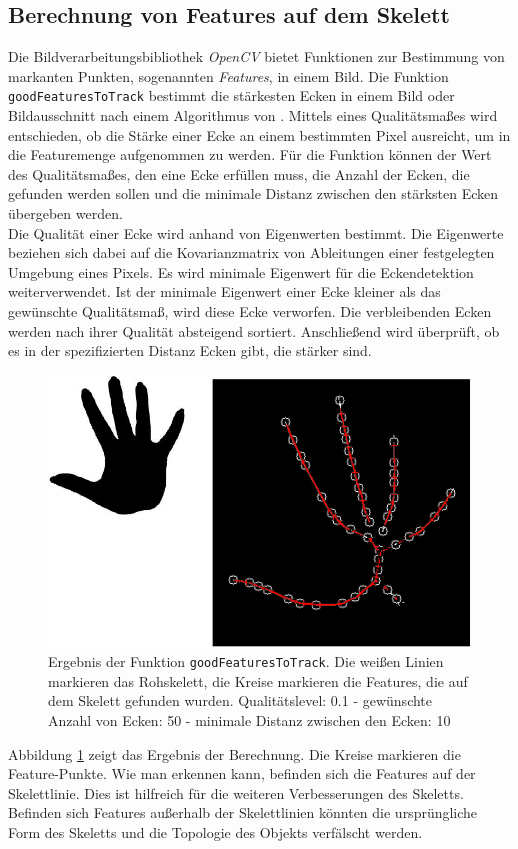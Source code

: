 \subsection{Berechnung von Features auf dem Skelett}
\label{subsec:features}
Die Bildverarbeitungsbibliothek \emph{OpenCV} bietet Funktionen zur Bestimmung von markanten Punkten, sogenannten \emph{Features},
in einem Bild. Die Funktion \texttt{goodFeaturesToTrack} bestimmt die stärkesten Ecken in einem Bild oder Bildausschnitt nach einem Algorithmus von \cite{goodfeatures}. Mittels eines Qualitätsmaßes wird entschieden, ob die Stärke einer
Ecke an einem bestimmten Pixel ausreicht, um in die Featuremenge aufgenommen zu werden. Für die
Funktion können der Wert des Qualitätsmaßes, den eine Ecke erfüllen muss, die Anzahl der Ecken, die gefunden werden sollen und die
minimale Distanz zwischen den stärksten Ecken übergeben werden.\\
Die Qualität einer Ecke wird anhand von Eigenwerten bestimmt. Die Eigenwerte beziehen sich dabei auf 
die Kovarianzmatrix von Ableitungen einer festgelegten Umgebung eines Pixels. Es wird minimale Eigenwert
für die Eckendetektion weiterverwendet. Ist der minimale Eigenwert einer Ecke kleiner als das gewünschte
Qualitätsmaß, wird diese Ecke verworfen. Die verbleibenden Ecken werden nach ihrer Qualität absteigend sortiert. Anschließend wird überprüft, ob es in der spezifizierten Distanz Ecken gibt, die stärker sind. 
\begin{figure}[htbp]
\centering
\includegraphics[width=0.4\linewidth]{./fig/features}
\caption{Ergebnis der Funktion \texttt{goodFeaturesToTrack}. Die weißen Linien markieren das Rohskelett, die Kreise markieren die Features, die auf dem Skelett gefunden wurden. Qualitätslevel: 0.1 - gewünschte Anzahl von Ecken: 50 - minimale Distanz zwischen den Ecken: 10}
\label{fig:features}
\end{figure}
Abbildung \ref{fig:features} zeigt das Ergebnis der Berechnung. Die Kreise markieren die Feature-Punkte. Wie man erkennen kann, befinden sich die Features auf der Skelettlinie. Dies ist hilfreich für die weiteren
Verbesserungen des Skeletts. Befinden sich Features außerhalb der Skelettlinien könnten die ursprüngliche Form des Skeletts und die Topologie des Objekts verfälscht werden.
